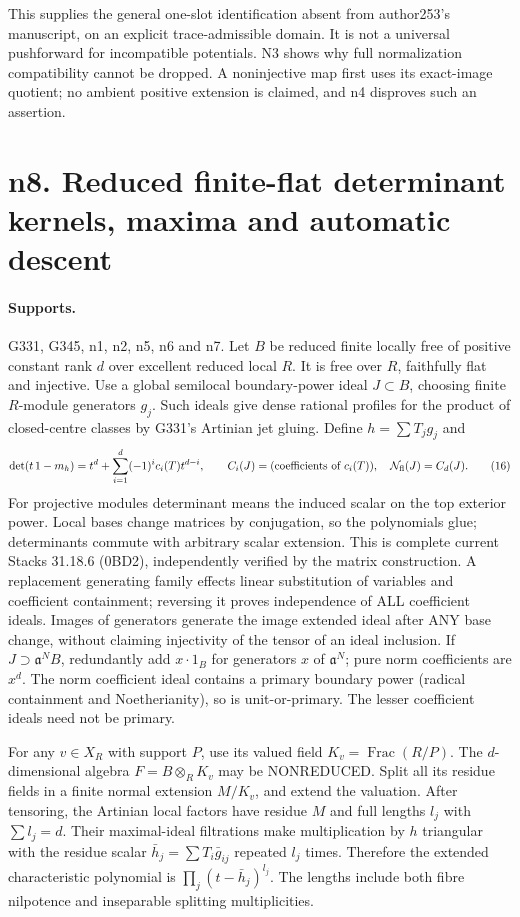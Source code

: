\documentclass[11pt]{article}
\begin{document}
This supplies the general one-slot identification absent from author253's manuscript, on an explicit trace-admissible domain. It is not a universal pushforward for incompatible potentials. N3 shows why full normalization compatibility cannot be dropped. A noninjective map first uses its exact-image quotient; no ambient positive extension is claimed, and n4 disproves such an assertion.


\section{n8. Reduced finite-flat determinant kernels, maxima and automatic descent}
\paragraph{Supports.} G331, G345, n1, n2, n5, n6 and n7.
Let $B$ be reduced finite locally free of positive constant rank $d$ over excellent reduced local $R$. It is free over $R$, faithfully flat and injective. Use a global semilocal boundary-power ideal $J\subset B$, choosing finite $R$-module generators $g_j$. Such ideals give dense rational profiles for the product of closed-centre classes by G331's Artinian jet gluing. Define $h=\sum T_jg_j$ and
\[
 \det(t\,1-m_h)=t^d+\sum_{i=1}^d(-1)^ic_i(T)t^{d-i},\qquad
 C_i(J)=(\text{coefficients of }c_i(T)),\quad \mathcal N_{\rm fl}(J)=C_d(J). \tag{16}
\]
For projective modules determinant means the induced scalar on the top exterior power. Local bases change matrices by conjugation, so the polynomials glue; determinants commute with arbitrary scalar extension. This is complete current Stacks 31.18.6 (0BD2), independently verified by the matrix construction. A replacement generating family effects linear substitution of variables and coefficient containment; reversing it proves independence of ALL coefficient ideals. Images of generators generate the image extended ideal after ANY base change, without claiming injectivity of the tensor of an ideal inclusion. If $J\supset\mathfrak a^NB$, redundantly add $x\cdot1_B$ for generators $x$ of $\mathfrak a^N$; pure norm coefficients are $x^d$. The norm coefficient ideal contains a primary boundary power (radical containment and Noetherianity), so is unit-or-primary. The lesser coefficient ideals need not be primary.

For any $v\in X_R$ with support $P$, use its valued field $K_v=\operatorname{Frac}(R/P)$. The $d$-dimensional algebra $F=B\otimes_RK_v$ may be NONREDUCED. Split all its residue fields in a finite normal extension $M/K_v$, and extend the valuation. After tensoring, the Artinian local factors have residue $M$ and full lengths $l_j$ with $\sum l_j=d$. Their maximal-ideal filtrations make multiplication by $h$ triangular with the residue scalar $\bar h_j=\sum T_i\bar g_{ij}$ repeated $l_j$ times. Therefore the extended characteristic polynomial is $\prod_j(t-\bar h_j)^{l_j}$. The lengths include both fibre nilpotence and inseparable splitting multiplicities.
\end{document}
